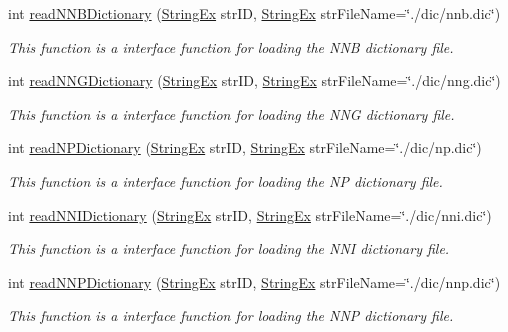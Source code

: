 \begin{CompactItemize}
int \hyperlink{classkmaOrange_1_1Dictionary_a94306b03154efe9b28bbbd84284ecd5}{readNNBDictionary} (\hyperlink{classStringEx}{StringEx} strID, \hyperlink{classStringEx}{StringEx} strFileName=\char`\"{}./dic/nnb.dic\char`\"{})
\begin{CompactList}\small\item\em This function is a interface function for loading the NNB dictionary file. \item\end{CompactList}\item 
int \hyperlink{classkmaOrange_1_1Dictionary_885af9add2e57735325161b0cbe50fd0}{readNNGDictionary} (\hyperlink{classStringEx}{StringEx} strID, \hyperlink{classStringEx}{StringEx} strFileName=\char`\"{}./dic/nng.dic\char`\"{})
\begin{CompactList}\small\item\em This function is a interface function for loading the NNG dictionary file. \item\end{CompactList}\item 
int \hyperlink{classkmaOrange_1_1Dictionary_997496836f194362ab9d1f2d942b952a}{readNPDictionary} (\hyperlink{classStringEx}{StringEx} strID, \hyperlink{classStringEx}{StringEx} strFileName=\char`\"{}./dic/np.dic\char`\"{})
\begin{CompactList}\small\item\em This function is a interface function for loading the NP dictionary file. \item\end{CompactList}\item 
int \hyperlink{classkmaOrange_1_1Dictionary_2bd3731eff30bd2fb68752357c5db962}{readNNIDictionary} (\hyperlink{classStringEx}{StringEx} strID, \hyperlink{classStringEx}{StringEx} strFileName=\char`\"{}./dic/nni.dic\char`\"{})
\begin{CompactList}\small\item\em This function is a interface function for loading the NNI dictionary file. \item\end{CompactList}\item 
int \hyperlink{classkmaOrange_1_1Dictionary_f233eb7cf842535ade20e4bb4b58ce1a}{readNNPDictionary} (\hyperlink{classStringEx}{StringEx} strID, \hyperlink{classStringEx}{StringEx} strFileName=\char`\"{}./dic/nnp.dic\char`\"{})
\begin{CompactList}\small\item\em This function is a interface function for loading the NNP dictionary file. \item\end{CompactList}\item 

\end{CompactItemize}
